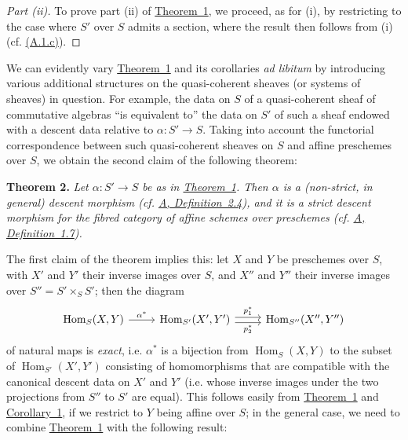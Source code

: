 \documentclass{article}
\newenvironment{itenv}[1]
  {\phantomsection\par\medskip\noindent\textbf{#1.}\itshape}
  {\par\medskip}
\DeclareMathOperator{\Hom}{Hom}
\newcommand{\oldpage}[1]{\marginpar{\footnotesize$\Big\vert$ \textit{p.~#1}}}
\begin{document}
\begin{proof}[Part (ii)]
To prove part (ii) of \hyperref[theorem:B.1(1)]{Theorem~1}, we proceed, as for (i), by restricting to the case where $S'$ over $S$ admits a section, where the result then follows from (i) (cf. \hyperref[A.1.c]{(A.1.c)}).
\end{proof}

We can evidently vary \hyperref[theorem:B.1(1)]{Theorem~1} and its corollaries \emph{ad libitum} by introducing various additional structures on the quasi-coherent sheaves (or systems of sheaves) in question.
For example, the data on $S$ of a
\oldpage{190-19}
quasi-coherent sheaf of commutative algebras ``is equivalent to'' the data on $S'$ of such a sheaf endowed with a descent data relative to $\alpha\colon S'\to S$.
Taking into account the functorial correspondence between such quasi-coherent sheaves on $S$ and affine preschemes over $S$, we obtain the second claim of the following theorem:

\begin{itenv}{Theorem 2}
\label{theorem:B.1(2)}
  Let $\alpha\colon S'\to S$ be as in \hyperref[theorem:B.1(1)]{Theorem~1}.
  Then $\alpha$ is a (non-strict, in general) \emph{descent morphism} (cf. \hyperref[definition:A.2.4]{A, Definition~2.4}), and it is a \emph{strict descent morphism} for the fibred category of affine schemes over preschemes (cf. \hyperref[definition:A.1.7]{A, Definition~1.7}).
\end{itenv}

The first claim of the theorem implies this:
let $X$ and $Y$ be preschemes over $S$, with $X'$ and $Y'$ their inverse images over $S$, and $X''$ and $Y''$ their inverse images over $S''=S'\times_S S'$;
then the diagram
\[
  \begin{tikzcd}
    \Hom_S(X,Y) \rar["\alpha^*"]
    & \Hom_{S'}(X',Y') \rar[shift left=1,"p_1^*"] \rar[shift right=1,swap,"p_2^*"]
    & \Hom_{S''}(X'',Y'')
  \end{tikzcd}
\]
of natural maps is \emph{exact}, i.e. $\alpha^*$ is a bijection from $\Hom_S(X,Y)$ to the subset of $\Hom_{S'}(X',Y')$ consisting of homomorphisms that are compatible with the canonical descent data on $X'$ and $Y'$ (i.e. whose inverse images under the two projections from $S''$ to $S'$ are equal).
This follows easily from \hyperref[theorem:B.1(1)]{Theorem~1} and \hyperref[corollary:B.1(1)]{Corollary~1}, if we restrict to $Y$ being affine over $S$;
in the general case, we need to combine \hyperref[theorem:B.1(1)]{Theorem~1} with the following result:
\end{document}

